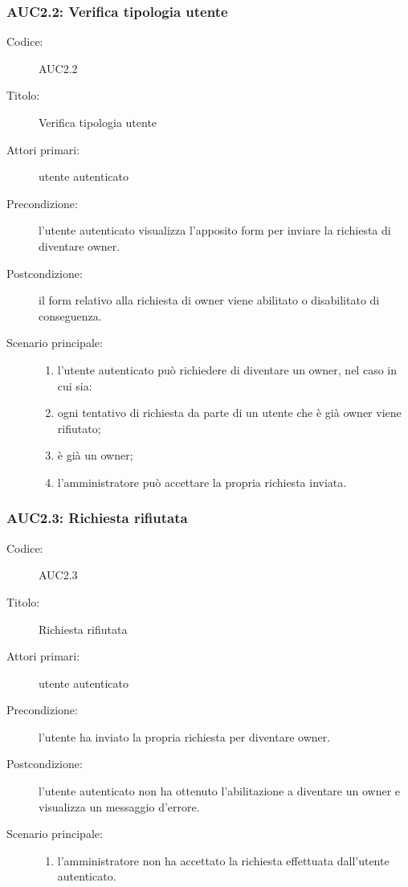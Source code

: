 \documentclass[../../../analisi-dei-requisiti.tex]{subfiles}
\begin{document}
\subsubsection{AUC2.2: Verifica tipologia utente}%
\label{subs:AUC2.2}
\begin{description}
  \item[Codice:] AUC2.2
  \item[Titolo:] Verifica tipologia utente
  \item[Attori primari:] utente autenticato
  \item[Precondizione:] l'utente autenticato visualizza l'apposito form per inviare la richiesta di diventare owner.
  \item[Postcondizione:] il form relativo alla richiesta di owner viene abilitato o disabilitato di conseguenza.
  \item[Scenario principale:]
  \begin{enumerate}
    \item l'utente autenticato può richiedere di diventare un owner, nel caso in cui sia:
    \item ogni tentativo di richiesta da parte di un utente che è già owner viene rifiutato;
    \item {} è già un owner;
    \item l'amministratore può accettare la propria richiesta inviata.
  \end{enumerate}
\end{description}

\subsubsection{AUC2.3: Richiesta rifiutata}%
\label{subs:AUC2.3}
\begin{description}
  \item[Codice:] AUC2.3
  \item[Titolo:] Richiesta rifiutata
  \item[Attori primari:] utente autenticato
  \item[Precondizione:] l'utente ha inviato la propria richiesta per diventare owner.
  \item[Postcondizione:] l'utente autenticato non ha ottenuto l'abilitazione a diventare un owner e visualizza un messaggio d'errore.
  \item[Scenario principale:]
  \begin{enumerate}
    \item l'amministratore non ha accettato la richiesta effettuata dall'utente autenticato.
  \end{enumerate}
\end{description}
\end{document}
